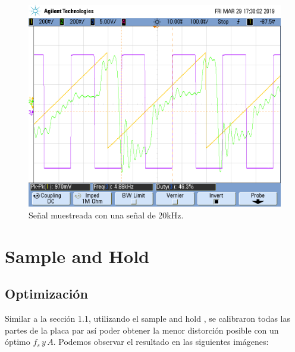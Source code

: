 \documentclass[../../ASSD_TP1_G7.tex]{subfiles}
\begin{document}
\begin{figure}[H]
\begin{centering}
\includegraphics[scale=0.3]{Imagenes/yh_pt6d_cuad2}
\par\end{centering}
\caption{Señal muestreada con una señal de 20kHz.}
\end{figure}

\newpage

\section{Sample and Hold}

\subsection{Optimización}

Similar a la sección 1.1, utilizando el sample and hold , se calibraron
todas las partes de la placa par así poder obtener la menor distorción
posible con un óptimo $f_{s}\,y\,A$. Podemos observar el resultado
en las siguientes imágenes:
\end{document}
